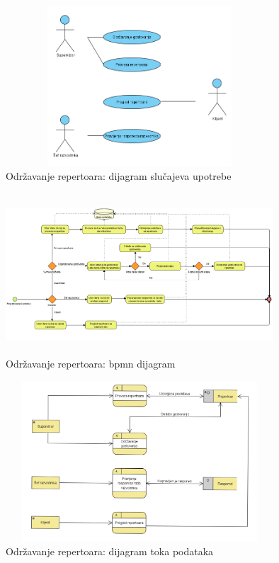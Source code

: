 \documentclass[a4paper]{article}
\begin{document}
  
\begin{figure}[H]
  \begin{center}
      \includegraphics[width=100mm,height=60mm]{../images/usecase_odrzavanje_repertoara.png}
  \end{center}
  \caption{Održavanje repertoara: dijagram slučajeva upotrebe}
  \label{usecase_odrzavanje_repertoara}
\end{figure}

\begin{figure}[H]
  \begin{center}
      \includegraphics[width=100mm,height=60mm]{../images/bpmn_odrzavanje_repertoara.png}
  \end{center}
  \caption{Održavanje repertoara: bpmn dijagram}
  \label{bpmn_odrzavanje_repertoara}
\end{figure}

\begin{figure}[H]
  \begin{center}
      \includegraphics[width=100mm,height=60mm]{../images/dfd2_odrzavanje_repertoara.png}
  \end{center}
  \caption{Održavanje repertoara: dijagram toka podataka}
  \label{dfd2_odrzavanje_repertoara}
\end{figure}
\end{document}
